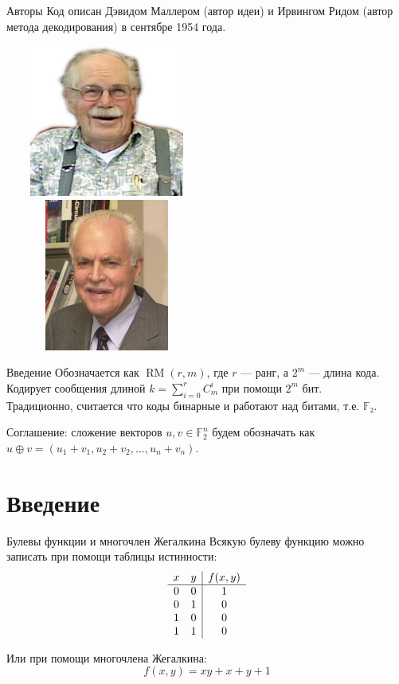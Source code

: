 \documentclass[beameroptions={aspectratio=169}]{beamerswitch}
\DeclareMathOperator{\RM}{RM}
\newcommand{\n}{\\}
\newcommand{\n}{ }
\begin{document}
\begin{nonspeaker}
\begin{frame}{Авторы}
    Код описан Дэвидом Маллером (автор идеи) и Ирвингом Ридом (автор метода декодирования) в сентябре 1954 года.

    \hfil%
    \includegraphics[width=0.5\textwidth,height=50mm,keepaspectratio]{DavidMuller.png}%
    \hfil%
    \includegraphics[width=0.5\textwidth,height=50mm,keepaspectratio]{reed.jpg}%
    \hfil

\end{frame}
\end{nonspeaker}

\begin{frame}{Введение}
    Обозначается как $\RM(r, m)$, где $r$ — ранг, а $2^m$ — длина кода. Кодирует сообщения длиной $k = \sum_{i=0}^{r} C_m^i$ при помощи $2^m$ бит. \n
    Традиционно, считается что коды бинарные и работают над битами, т.е. $𝔽₂$.
    
    Соглашение: сложение векторов $u, v ∈ 𝔽_2^n$ будем обозначать как $u ⊕ v = (u_1 + v_1, u_2 + v_2, …, u_n + v_n)$.
\end{frame}

\section{Введение}
\begin{frame}{Булевы функции и многочлен Жегалкина}
    Всякую булеву функцию можно записать при помощи таблицы истинности:
    \[
        \begin{array}{cc | c}
            x & y & f(x, y) \\\hline
            0 & 0 & 1 \\
            0 & 1 & 0 \\
            1 & 0 & 0 \\
            1 & 1 & 0
        \end{array}
    \]

    Или при помощи многочлена Жегалкина:
    \[
        f(x, y) = xy + x + y + 1
    \]
\end{frame}
\end{document}

